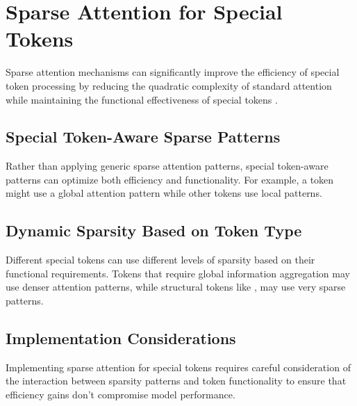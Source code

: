 \section{Sparse Attention for Special Tokens}

Sparse attention mechanisms can significantly improve the efficiency of special token processing by reducing the quadratic complexity of standard attention while maintaining the functional effectiveness of special tokens \citep{child2019generating, beltagy2020longformer}.

\subsection{Special Token-Aware Sparse Patterns}

Rather than applying generic sparse attention patterns, special token-aware patterns can optimize both efficiency and functionality. For example, a \cls{} token might use a global attention pattern while other tokens use local patterns.

\subsection{Dynamic Sparsity Based on Token Type}

Different special tokens can use different levels of sparsity based on their functional requirements. Tokens that require global information aggregation may use denser attention patterns, while structural tokens like \sep{} may use very sparse patterns.

\subsection{Implementation Considerations}

Implementing sparse attention for special tokens requires careful consideration of the interaction between sparsity patterns and token functionality to ensure that efficiency gains don't compromise model performance.